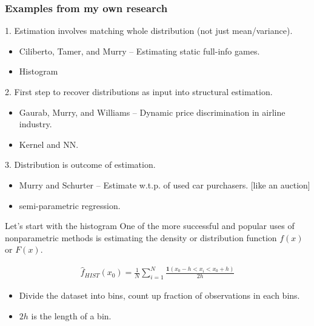 \begin{frame}[c]\frametitle{Examples from my own research}
    

1. Estimation involves matching whole distribution (not just mean/variance).\\[-.25em]
\begin{itemize}
  \item Ciliberto, Tamer, and Murry -- Estimating static full-info games. 
  \item Histogram
\end{itemize}

2. First step to recover distributions as input into structural estimation.\\[-.25em]
\begin{itemize}
  \item Gaurab, Murry, and Williams -- Dynamic price discrimination in airline industry. 
  \item Kernel and NN.
\end{itemize}


3. Distribution is outcome of estimation.\\[-.25em]
\begin{itemize}
  \item Murry and Schurter -- Estimate w.t.p. of used car purchasers. [like an auction]
  \item semi-parametric regression.
\end{itemize}


\end{frame}




\begin{frame}{Let's start with the histogram}
  One of the more successful and popular uses of nonparametric methods is estimating the density or distribution function $f(x)$ or $F(x)$.
  
  \begin{eqnarray*}
    \hat{f}_{HIST}(x_0) = \frac{1}{N} \sum_{i=1}^N \frac{\mathbf{1}(x_0 - h < x_i < x_0 + h)}{2 h}
  \end{eqnarray*}
    
  \begin{itemize}
  \item Divide the dataset into bins, count up fraction of observations in each bins.
  \item $2h$ is the length of a bin. 
  \end{itemize}
\end{frame}
 


